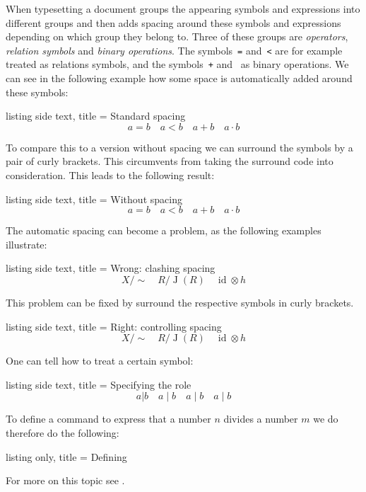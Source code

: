 \documentclass[a4paper, 10pt, headings=standardclasses, oneside, bibliography=totocnumbered]{scrbook}
\begin{document}
When typesetting a document  groups the appearing symbols and expressions into different groups and then adds spacing around these symbols and expressions depending on which group they belong to.
Three of these groups are \emph{operators}, \emph{relation symbols} and \emph{binary operations}.
The symbols~\texttt{=} and~\texttt{<} are for example treated as relations symbols, and the symbols~\texttt{+} and~ as binary operations.
We can see in the following example how some space is automatically added around these symbols:
\begin{tcblisting}{listing side text, title = {Standard spacing}}
\[
  a = b
  \quad
  a < b
  \quad
  a + b
  \quad
  a \cdot b
\]
\end{tcblisting}
To compare this to a version without spacing we can surround the symbols by a pair of curly brackets.
This circumvents  from taking the surround code into consideration.
This leads to the following result:
\begin{tcblisting}{listing side text, title = {Without spacing}}
\[
  a {=} b
  \quad
  a {<} b
  \quad
  a {+} b
  \quad
  a {\cdot} b
\]
\end{tcblisting}
The automatic spacing can become a problem, as the following examples illustrate:
\begin{tcblisting}{listing side text, title = {Wrong: clashing spacing}}
\[
  X/\sim
  \quad
  R/\operatorname{J}(R)
  \quad
  \operatorname{id} \otimes h
\]
\end{tcblisting}
This problem can be fixed by surround the respective symbols in curly brackets.
\begin{tcblisting}{listing side text, title = {Right: controlling spacing}}
\[
  X/{\sim}
  \quad
  R/{\operatorname{J}(R)}
  \quad
  {\operatorname{id}} \otimes h
\]
\end{tcblisting}
One can tell  how to treat a certain symbol:
\begin{tcblisting}{listing side text, title = {Specifying the role}}
\[
  a | b
  \quad
  a \mathop{|} b
  \quad
  a \mathrel{|} b
  \quad
  a \mathbin{|} b
\]
\end{tcblisting}
To define a command  to express that a number $n$ divides a number $m$ we do therefore do the following:
\begin{tcblisting}{listing only, title = {Defining }}
\newcommand{\divides}{\mathrel{|}}
\end{tcblisting}
For more on this topic see \cite{tex_binrel}.
\end{document}
